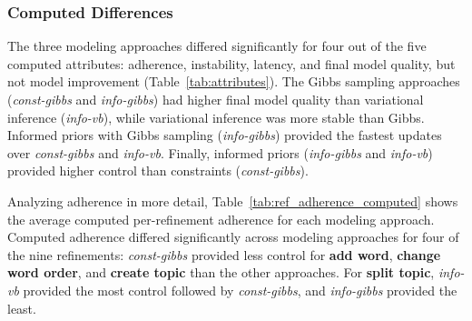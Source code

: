 \subsubsection{Computed Differences}
\label{sec:calculated-differences}
The three modeling approaches differed significantly for four out of
the five computed attributes: adherence, instability, latency, and
final model quality, but not model improvement
(Table~\ref{tab:attributes}). The Gibbs sampling approaches
(\textit{const-gibbs} and \textit{info-gibbs}) had higher final model
quality than variational inference (\textit{info-vb}), while
variational inference was more stable than Gibbs. Informed priors with
Gibbs sampling (\textit{info-gibbs}) provided the fastest updates over
\textit{const-gibbs} and \textit{info-vb}. Finally, informed priors
(\textit{info-gibbs} and \textit{info-vb}) provided higher control
than constraints (\textit{const-gibbs}).

Analyzing adherence in more detail, Table~\ref{tab:ref_adherence_computed} shows the average computed per-refinement adherence for each modeling approach. Computed adherence differed significantly across modeling approaches for four of the nine refinements: \textit{const-gibbs} provided less control for \textbf{add word}, \textbf{change word order}, and \textbf{create topic} than the other approaches. For \textbf{split topic}, \textit{info-vb} provided the most control followed by \textit{const-gibbs}, and \textit{info-gibbs} provided the least.


